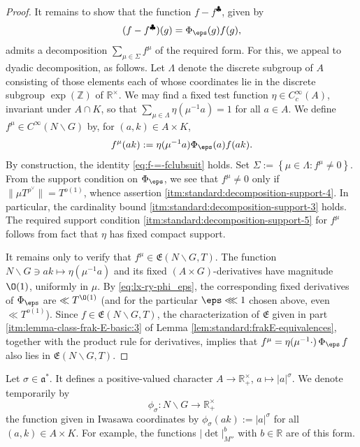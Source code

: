 \begin{proof}
  It remains to show that the function $f - f^{\clubsuit}$, given by
  \begin{equation*}
    (f - f^{\clubsuit})(g) =  \Phi_\eps(g) f(g),
  \end{equation*}
  admits a decomposition $\sum_{\mu \in \Sigma} f^\mu$ of the required form.  For this, we appeal to dyadic decomposition, as follows.  Let $\Lambda$ denote the discrete subgroup of $A$ consisting of those elements each of whose coordinates lie in the discrete subgroup $\exp(\mathbb{Z})$ of $\mathbb{R}^\times$.  We may find a fixed test function $\eta \in C_c^\infty(A)$, invariant under $A \cap K$, so that $\sum_{\mu \in \Lambda} \eta(\mu^{-1} a) = 1$ for all $a \in A$.  We define $f^{\mu} \in C^\infty(N \backslash G)$ by, for $(a,k) \in A \times K$,
  \begin{equation*}
    f^{\mu}(a k) := \eta(\mu^{-1} a) \Phi_\eps(a) f(a k).
  \end{equation*}
  By construction, the identity \eqref{eq:f-=-fclubsuit} holds.  Set $\Sigma := \left\{ \mu \in \Lambda : f^\mu \neq 0 \right\}$.  From the support condition on $\Phi_\eps$, we see that $f^\mu \neq 0$ only if $\|\mu T^{\rho^\vee}\| = T^{o(1)}$, whence assertion \eqref{itm:standard:decomposition-support-4}.  In particular, the cardinality bound \eqref{itm:standard:decomposition-support-3} holds.  The required support condition \eqref{itm:standard:decomposition-support-5} for $f^\mu$ follows from fact that $\eta$ has fixed compact support.

  It remains only to verify that $f^{\mu} \in \mathfrak{E}(N \backslash G, T)$.
  The function $N \backslash G \ni a k \mapsto \eta(\mu^{-1} a)$ and its fixed $(A \times G)$-derivatives have magnitude $\O(1)$, uniformly in $\mu$.  By \eqref{eq:lx-ry-phi_eps}, the corresponding fixed derivatives of $\Phi_\eps$ are $\ll T^{\O(1)}$ (and for the particular $\eps \lll 1$ chosen above, even $\ll T^{o(1)}$).  Since $f \in \mathfrak{E}(N \backslash G, T)$, the characterization of $\mathfrak{E}$ given in part \eqref{itm:lemma-class-frak-E-basic:3} of Lemma \ref{lem:standard:frakE-equivalences}, together with the product rule for derivatives, implies that $f^{\mu} = \eta(\mu^{-1}\cdot)\,\Phi_\eps\,f$ also lies in $\mathfrak{E}(N \backslash G, T)$.
\end{proof}





Let $\sigma \in \mathfrak{a}^*$.  It defines a positive-valued character $A \rightarrow \mathbb{R}^\times_+$, $a \mapsto |a|^{\sigma}$.  We denote temporarily by
\begin{equation*}
  \phi_\sigma : N \backslash G \rightarrow \mathbb{R}^\times_+
\end{equation*}
the function given in Iwasawa coordinates by $\phi_\sigma(a k) := |a|^{\sigma}$ for all $(a,k) \in A \times K$.  For example, the functions $|\det|_{M''}^{b}$ with $b \in \mathbb{R}$ are of this form.

